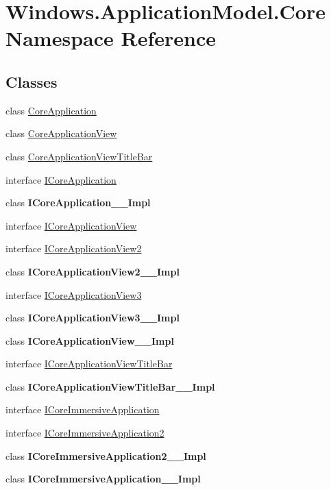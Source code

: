 \hypertarget{namespace_windows_1_1_application_model_1_1_core}{}\section{Windows.\+Application\+Model.\+Core Namespace Reference}
\label{namespace_windows_1_1_application_model_1_1_core}
\subsection*{Classes}
\begin{DoxyCompactItemize}
\item 
class \hyperlink{class_windows_1_1_application_model_1_1_core_1_1_core_application}{Core\+Application}
\item 
class \hyperlink{class_windows_1_1_application_model_1_1_core_1_1_core_application_view}{Core\+Application\+View}
\item 
class \hyperlink{class_windows_1_1_application_model_1_1_core_1_1_core_application_view_title_bar}{Core\+Application\+View\+Title\+Bar}
\item 
interface \hyperlink{interface_windows_1_1_application_model_1_1_core_1_1_i_core_application}{I\+Core\+Application}
\item 
class {\bfseries I\+Core\+Application\+\_\+\+\_\+\+Impl}
\item 
interface \hyperlink{interface_windows_1_1_application_model_1_1_core_1_1_i_core_application_view}{I\+Core\+Application\+View}
\item 
interface \hyperlink{interface_windows_1_1_application_model_1_1_core_1_1_i_core_application_view2}{I\+Core\+Application\+View2}
\item 
class {\bfseries I\+Core\+Application\+View2\+\_\+\+\_\+\+Impl}
\item 
interface \hyperlink{interface_windows_1_1_application_model_1_1_core_1_1_i_core_application_view3}{I\+Core\+Application\+View3}
\item 
class {\bfseries I\+Core\+Application\+View3\+\_\+\+\_\+\+Impl}
\item 
class {\bfseries I\+Core\+Application\+View\+\_\+\+\_\+\+Impl}
\item 
interface \hyperlink{interface_windows_1_1_application_model_1_1_core_1_1_i_core_application_view_title_bar}{I\+Core\+Application\+View\+Title\+Bar}
\item 
class {\bfseries I\+Core\+Application\+View\+Title\+Bar\+\_\+\+\_\+\+Impl}
\item 
interface \hyperlink{interface_windows_1_1_application_model_1_1_core_1_1_i_core_immersive_application}{I\+Core\+Immersive\+Application}
\item 
interface \hyperlink{interface_windows_1_1_application_model_1_1_core_1_1_i_core_immersive_application2}{I\+Core\+Immersive\+Application2}
\item 
class {\bfseries I\+Core\+Immersive\+Application2\+\_\+\+\_\+\+Impl}
\item 
class {\bfseries I\+Core\+Immersive\+Application\+\_\+\+\_\+\+Impl}
\end{DoxyCompactItemize}

